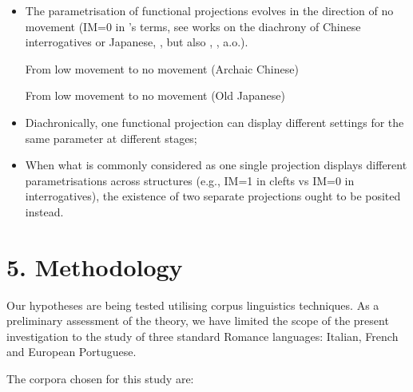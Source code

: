 \documentclass[fleqn,10pt]{wlscirep}
\begin{document}
\begin{itemize}
\item The parametrisation of functional projections evolves in the direction of no movement (IM=0 in \citeauthor{rizzi2017}’s \citeyear{rizzi2017} terms, see works on the diachrony of Chinese interrogatives \citealt{aldridge2010clause} or Japanese, \citealt{aldridge2009old}, but also \citealt{roberts2003syntactic}, \citealt{dadan2019}, a.o.).

\begin{exe}
    \ex From low movement to no movement (Archaic Chinese)
\end{exe}
\begin{exe}
    \ex From low movement to no movement (Old Japanese)
\end{exe}

\item Diachronically, one functional projection can display different settings for the same parameter at different stages;

\item When what is commonly considered as one single projection displays different parametrisations across structures (e.g., IM=1 in clefts vs IM=0 in interrogatives), the existence of two separate projections ought to be posited instead.
\end{itemize}

\section*{5. Methodology}

Our hypotheses are being tested utilising corpus linguistics techniques. 
As a preliminary assessment of the theory, we have limited the scope of the present investigation to the study of three standard Romance languages: Italian, French and European Portuguese. 

The corpora chosen for this study are: 
\end{document}
